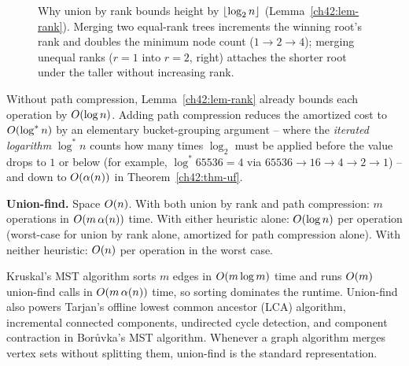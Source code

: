 \begin{figure}[htbp]
\caption{Why union by rank bounds height by $\lfloor\log_2 n\rfloor$ (Lemma~\ref{ch42:lem-rank}). Merging two equal-rank trees increments the winning root's rank and doubles the minimum node count ($1 \to 2 \to 4$); merging unequal ranks ($r=1$ into $r=2$, right) attaches the shorter root under the taller without increasing rank.}
\label{ch42:fig-union-rank}
\end{figure}

Without path compression, Lemma~\ref{ch42:lem-rank} already bounds each operation by $O(\log n)$. Adding path compression reduces the amortized cost to $O(\log^* n)$ by an elementary bucket-grouping argument -- where the \emph{iterated logarithm} $\log^* n$ counts how many times $\log_2$ must be applied before the value drops to $1$ or below (for example, $\log^* 65536 = 4$ via $65536 \to 16 \to 4 \to 2 \to 1$) -- and down to $O(\alpha(n))$ in Theorem~\ref{ch42:thm-uf}.

\begin{complexitybox}
\textbf{Union-find.} Space $O(n)$. With both union by rank and path compression: $m$ operations in $O(m\,\alpha(n))$ time. With either heuristic alone: $O(\log n)$ per operation (worst-case for union by rank alone, amortized for path compression alone). With neither heuristic: $O(n)$ per operation in the worst case.
\end{complexitybox}

\begin{applicationbox}
Kruskal's MST algorithm sorts $m$ edges in $O(m\log m)$ time and runs $O(m)$ union-find calls in $O(m\,\alpha(n))$ time, so sorting dominates the runtime. Union-find also powers Tarjan's offline lowest common ancestor (LCA) algorithm, incremental connected components, undirected cycle detection, and component contraction in Bor\r{u}vka's MST algorithm. Whenever a graph algorithm merges vertex sets without splitting them, union-find is the standard representation.
\end{applicationbox}

